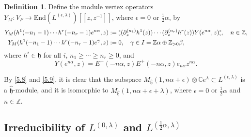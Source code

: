 \documentclass[12pt,a4paper,reqno]{amsart}
\numberwithin{equation}{section}
\numberwithin{equation}{section}
\theoremstyle{definition}
\newtheorem{df}[thm]{Definition}
\newcommand{\Z}{\mathbb{Z}}
\def \C {\mathbb{C}}
\def\la{\lambda}
\def \al{\alpha}
\def \ga {\gamma}
\def \b {\beta}
\def \op {\oplus}
\def \h {\mathfrak{h}}
\def \End {\mathrm{End}}
\begin{document}
\begin{df}
		Define the module vertex operators $Y_M: V_P\to \End(L^{(\epsilon,\la)})[[z,z^{-1}]]$, where $\epsilon=0$ or $\frac{1}{2}\al$, by
		\begin{align}
			Y_M(h^1(-n_1-1)\cdots h^r(-n_r-1)e^{n\al}, z)
			&:={\tiny\begin{matrix}\circ \\\circ\end{matrix}}
			(\partial_{z}^{(n_1)}h^1(z))\cdots (\partial_{z}^{(n_r)}h^r(z))
			Y(e^{n\al},z)
			{\tiny\begin{matrix}\circ \\\circ\end{matrix}},
			\quad n\in \Z,\label{5.12}\\
			Y_M(h^1(-n_1-1)\cdots h^r(-n_r-1)e^{\ga}, z)
			&:=0,\quad \ga\in I=\Z\al\op \Z_{>0}\b, \label{5.13}
		\end{align}
		where $h^i\in \h$ for all $i$, $n_1\geq \cdots \geq n_r\geq 0$, and 
		\[
		Y(e^{n\al},z)=E^-(-n\al,z)E^+(-n\al,z)e_{n\al}z^{n\al}.
		\]
	\end{df}
	
	By \eqref{5.8} and \eqref{5.9}, it is clear that the subspace $M_{\hat{\h}}(1,n\al+\epsilon)\otimes \C e^\la\subset L^{(\epsilon,\la)}$ is a $\hat{\h}$-module, and it is isomorphic to $M_{\hat{\h}}(1,n\al+\epsilon+\la)$, where $\epsilon=0$ or $\tfrac{1}{2}\al$ and $n\in \Z$.
	
	
	\subsection{Irreducibility of $L^{(0,\la)}$ and $L^{(\frac{1}{2}\al,\la)}$}
	
\end{document}
